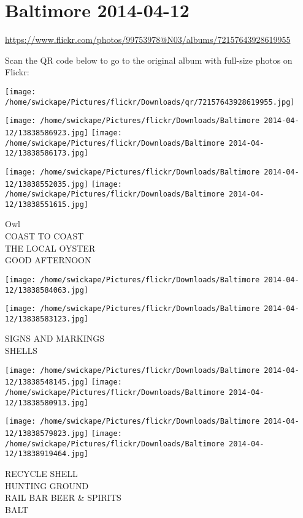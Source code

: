 \documentclass[10pt,letterpaper]{article}
\title{}
\author{}
\date{}
\begin{document}
\section*{Baltimore 2014-04-12}

\url{https://www.flickr.com/photos/99753978@N03/albums/72157643928619955}

Scan the QR code below to go to the original album with full-size photos on Flickr:

\texttt{[image: /home/swickape/Pictures/flickr/Downloads/qr/72157643928619955.jpg]}
\pagebreak

\texttt{[image: /home/swickape/Pictures/flickr/Downloads/Baltimore 2014-04-12/13838586923.jpg]}
\texttt{[image: /home/swickape/Pictures/flickr/Downloads/Baltimore 2014-04-12/13838586173.jpg]}

\texttt{[image: /home/swickape/Pictures/flickr/Downloads/Baltimore 2014-04-12/13838552035.jpg]}
\texttt{[image: /home/swickape/Pictures/flickr/Downloads/Baltimore 2014-04-12/13838551615.jpg]}

Owl\\
COAST TO COAST\\
THE LOCAL OYSTER\\
GOOD AFTERNOON
\pagebreak

\texttt{[image: /home/swickape/Pictures/flickr/Downloads/Baltimore 2014-04-12/13838584063.jpg]}

\vspace{0.25in}
\texttt{[image: /home/swickape/Pictures/flickr/Downloads/Baltimore 2014-04-12/13838583123.jpg]}

SIGNS AND MARKINGS\\
SHELLS
\pagebreak

\texttt{[image: /home/swickape/Pictures/flickr/Downloads/Baltimore 2014-04-12/13838548145.jpg]}
\texttt{[image: /home/swickape/Pictures/flickr/Downloads/Baltimore 2014-04-12/13838580913.jpg]}

\texttt{[image: /home/swickape/Pictures/flickr/Downloads/Baltimore 2014-04-12/13838579823.jpg]}
\texttt{[image: /home/swickape/Pictures/flickr/Downloads/Baltimore 2014-04-12/13838919464.jpg]}

RECYCLE SHELL\\
HUNTING GROUND\\
RAIL BAR BEER \& SPIRITS\\
BALT
\pagebreak
\end{document}
